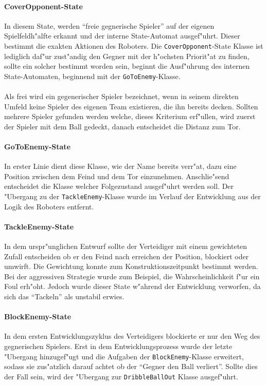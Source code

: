 \paragraph{CoverOpponent-State}
In diesem State, werden ``freie gegnerische Spieler'' auf der eigenen Spielfeldh"alfte erkannt und der interne State-Automat ausgef"uhrt. Dieser bestimmt die exakten Aktionen des Roboters. Die \lstinline{CoverOpponent}-State Klasse ist lediglich daf"ur zust"andig den Gegner mit der h"ochsten Priorit"at zu finden, sollte ein solcher bestimmt worden sein, beginnt die Ausf"uhrung des internen State-Automaten, beginnend mit der \lstinline{GoToEnemy}-Klasse.\\
\\
Als frei wird ein gegenerischer Spieler bezeichnet, wenn in seinem direkten Umfeld keine Spieler des eigenen Team existieren, die ihn bereits decken. Sollten mehrere Spieler gefunden werden welche, dieses Kriterium erf"ullen, wird zuerst der Spieler mit dem Ball gedeckt, danach entscheidet die Distanz zum Tor.

\paragraph{GoToEnemy-State}
In erster Linie dient diese Klasse, wie der Name bereits verr"at, dazu eine Position zwischen dem Feind und dem Tor einzunehmen. Anschlie"send entscheidet die Klasse welcher Folgezustand ausgef"uhrt werden soll. Der "Ubergang zu der \lstinline{TackleEnemy}-Klasse wurde im Verlauf der Entwicklung aus der Logik des Roboters entfernt.

\paragraph{TackleEnemy-State}
In dem urspr"unglichen Entwurf sollte der Verteidiger mit einem gewichteten Zufall entscheiden ob er den Feind nach erreichen der Position, blockiert oder umwirft. Die Gewichtung konnte zum Konstruktionszeitpunkt bestimmt werden. Bei der aggressiven Strategie wurde zum Beispiel, die Wahrscheinlichkeit f"ur ein Foul erh"oht. Jedoch wurde dieser State w"ahrend der Entwicklung verworfen, da sich das ``Tackeln'' als unstabil erwies.

\paragraph{BlockEnemy-State}
In dem ersten Entwicklungszyklus des Verteidigers blockierte er nur den Weg des gegnerischen Spielers. Erst in dem Entwicklungsprozess wurde der letzte "Ubergang hinzugef"ugt und die Aufgaben der \lstinline{BlockEnemy}-Klasse erweitert, sodass sie zus"atzlich darauf achtet ob der ``Gegner den Ball verliert''. Sollte dies der Fall sein, wird der "Ubergang zur \lstinline{DribbleBallOut} Klasse ausgef"uhrt.

